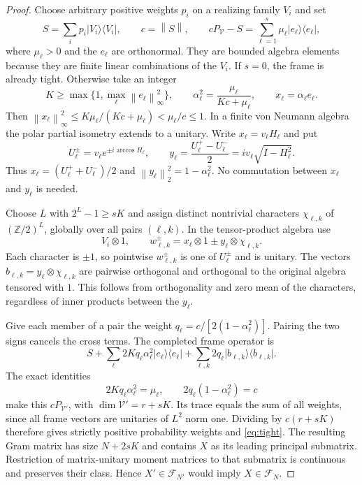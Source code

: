 \documentclass[11pt]{article}
\theoremstyle{definition}
\theoremstyle{remark}
\newcommand{\Fm}{\mathcal F}
\newcommand{\norm}[1]{\left\lVert#1\right\rVert}
\newcommand{\ket}[1]{\lvert#1\rangle}
\newcommand{\bra}[1]{\langle#1\rvert}
\begin{document}
\begin{proof}
Choose arbitrary positive weights $p_i$ on a realizing family $V_i$ and set
\[
 S=\sum_i p_i\ket{V_i}\bra{V_i},\qquad c=\norm S,
 \qquad cP_{\mathcal V}-S=\sum_{\ell=1}^s\mu_\ell\ket{e_\ell}\bra{e_\ell},
\]
where $\mu_\ell>0$ and the $e_\ell$ are orthonormal. They are bounded algebra elements because they are finite linear combinations of the $V_i$. If $s=0$, the frame is already tight. Otherwise take an integer
\[
 K\ge\max\{1,\max_\ell\norm{e_\ell}_\infty^2\},\qquad
 \alpha_\ell^2=\frac{\mu_\ell}{Kc+\mu_\ell},\qquad x_\ell=\alpha_\ell e_\ell.
\]
Then $\norm{x_\ell}_\infty^2\le K\mu_\ell/(Kc+\mu_\ell)<\mu_\ell/c\le1$. In a finite von Neumann algebra the polar partial isometry extends to a unitary. Write $x_\ell=v_\ell H_\ell$ and put
\[
 U_\ell^\pm=v_\ell e^{\pm i\arccos H_\ell},\qquad
 y_\ell=\frac{U_\ell^+-U_\ell^-}{2}
       =iv_\ell\sqrt{I-H_\ell^2}.
\]
Thus $x_\ell=(U_\ell^++U_\ell^-)/2$ and $\norm{y_\ell}_2^2=1-\alpha_\ell^2$. No commutation between $x_\ell$ and $y_\ell$ is needed.

Choose $L$ with $2^L-1\ge sK$ and assign distinct nontrivial characters $\chi_{\ell,k}$ of $(\mathbb Z/2)^L$, globally over all pairs $(\ell,k)$. In the tensor-product algebra use
\[
 V_i\otimes1,\qquad
 w_{\ell,k}^\pm=x_\ell\otimes1\pm y_\ell\otimes\chi_{\ell,k}.
\]
Each character is $\pm1$, so pointwise $w_{\ell,k}^\pm$ is one of $U_\ell^\pm$ and is unitary. The vectors $b_{\ell,k}=y_\ell\otimes\chi_{\ell,k}$ are pairwise orthogonal and orthogonal to the original algebra tensored with $1$. This follows from orthogonality and zero mean of the characters, regardless of inner products between the $y_\ell$.

Give each member of a pair the weight $q_\ell=c/[2(1-\alpha_\ell^2)]$. Pairing the two signs cancels the cross terms. The completed frame operator is
\[
 S+\sum_\ell2Kq_\ell\alpha_\ell^2\ket{e_\ell}\bra{e_\ell}
   +\sum_{\ell,k}2q_\ell\ket{b_{\ell,k}}\bra{b_{\ell,k}}.
\]
The exact identities
\[
 2Kq_\ell\alpha_\ell^2=\mu_\ell,
 \qquad 2q_\ell(1-\alpha_\ell^2)=c
\]
make this $cP_{\mathcal V'}$, with $\dim\mathcal V'=r+sK$. Its trace equals the sum of all weights, since all frame vectors are unitaries of $L^2$ norm one. Dividing by $c(r+sK)$ therefore gives strictly positive probability weights and \eqref{eq:tight}. The resulting Gram matrix has size $N+2sK$ and contains $X$ as its leading principal submatrix. Restriction of matrix-unitary moment matrices to that submatrix is continuous and preserves their class. Hence $X'\in\Fm_{N'}$ would imply $X\in\Fm_N$.
\end{proof}
\end{document}
